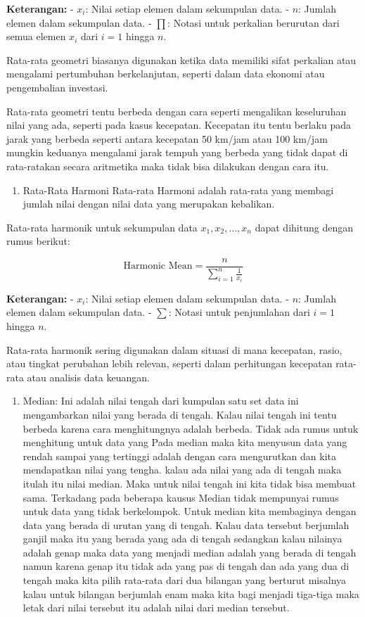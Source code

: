 \documentclass[
]{book}
\providecommand{\tightlist}{%
  \setlength{\itemsep}{0pt}\setlength{\parskip}{0pt}}
\theoremstyle{definition}
\theoremstyle{definition}
\theoremstyle{definition}
\theoremstyle{definition}
\theoremstyle{remark}
\begin{document}
\textbf{Keterangan:}
- \(x_i\): Nilai setiap elemen dalam sekumpulan data.
- \(n\): Jumlah elemen dalam sekumpulan data.
- \(\prod\): Notasi untuk perkalian berurutan dari semua elemen \(x_i\) dari \(i = 1\) hingga \(n\).

Rata-rata geometri biasanya digunakan ketika data memiliki sifat perkalian atau mengalami pertumbuhan berkelanjutan, seperti dalam data ekonomi atau pengembalian investasi.

Rata-rata geometri tentu berbeda dengan cara seperti mengalikan keseluruhan nilai yang ada, seperti pada kasus kecepatan. Kecepatan itu tentu berlaku pada jarak yang berbeda seperti antara kecepatan 50 km/jam atau 100 km/jam mungkin keduanya mengalami jarak tempuh yang berbeda yang tidak dapat di rata-ratakan secara aritmetika maka tidak bisa dilakukan dengan cara itu.

\begin{enumerate}
\def\labelenumi{\arabic{enumi}.}
\setcounter{enumi}{2}
\tightlist
\item
  Rata-Rata Harmoni
  Rata-rata Harmoni adalah rata-rata yang membagi jumlah nilai dengan nilai data yang merupakan kebalikan.
\end{enumerate}

Rata-rata harmonik untuk sekumpulan data \(x_1, x_2, \dots, x_n\) dapat dihitung dengan rumus berikut:

\[
\text{Harmonic Mean} = \frac{n}{\sum_{i=1}^{n} \frac{1}{x_i}}
\]

\textbf{Keterangan:}
- \(x_i\): Nilai setiap elemen dalam sekumpulan data.
- \(n\): Jumlah elemen dalam sekumpulan data.
- \(\sum\): Notasi untuk penjumlahan dari \(i = 1\) hingga \(n\).

Rata-rata harmonik sering digunakan dalam situasi di mana kecepatan, rasio, atau tingkat perubahan lebih relevan, seperti dalam perhitungan kecepatan rata-rata atau analisis data keuangan.

\begin{enumerate}
\def\labelenumi{\arabic{enumi}.}
\setcounter{enumi}{3}
\tightlist
\item
  Median: Ini adalah nilai tengah dari kumpulan satu set data ini mengambarkan nilai yang berada di tengah. Kalau nilai tengah ini tentu berbeda karena cara menghitungnya adalah berbeda. Tidak ada rumus untuk menghitung untuk data yang Pada median maka kita menyusun data yang rendah sampai yang tertinggi adalah dengan cara mengurutkan dan kita mendapatkan nilai yang tengha. kalau ada nilai yang ada di tengah maka itulah itu nilai median. Maka untuk nilai tengah ini kita tidak bisa membuat sama. Terkadang pada beberapa kausus
  Median tidak mempunyai rumus untuk data yang tidak berkelompok. Untuk median kita membaginya dengan data yang berada di urutan yang di tengah. Kalau data tersebut berjumlah ganjil maka itu yang berada yang ada di tengah sedangkan kalau nilainya adalah genap maka data yang menjadi median adalah yang berada di tengah namun karena genap itu tidak ada yang pas di tengah dan ada yang dua di tengah maka kita pilih rata-rata dari dua bilangan yang berturut misalnya kalau untuk bilangan berjumlah enam maka kita bagi menjadi tiga-tiga maka letak dari nilai tersebut itu adalah nilai dari median tersebut.
\end{enumerate}
\end{document}
